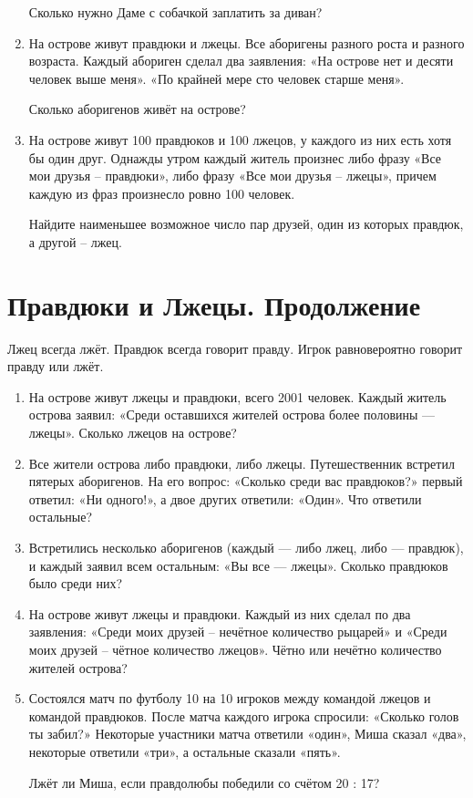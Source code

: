 \documentclass[12pt]{article}
\theoremstyle{definition}
\begin{document}
\begin{enumerate}
  Сколько нужно Даме с собачкой заплатить за диван?

  \item На острове живут правдюки и лжецы. Все аборигены разного роста и разного возраста. Каждый абориген сделал два заявления:
  «На острове нет и десяти человек выше меня». «По крайней мере сто человек старше меня».

  Сколько аборигенов живёт на острове?


  \item На острове живут 100 правдюков и 100 лжецов, у каждого из них есть хотя бы один друг. 
  Однажды утром каждый житель произнес либо фразу «Все мои друзья – правдюки», либо фразу «Все мои друзья – лжецы», 
  причем каждую из фраз произнесло ровно 100 человек. 
  
  Найдите наименьшее возможное число пар друзей, один из которых правдюк, а другой – лжец. 



\end{enumerate}


\setcounter{section}{1}
\section{Правдюки и Лжецы. Продолжение}

Лжец всегда лжёт. Правдюк всегда говорит правду. Игрок равновероятно говорит правду или лжёт. 

\begin{enumerate}
  \item На острове живут лжецы и правдюки, всего 2001 человек. 
  Каждый житель острова заявил: «Среди оставшихся жителей острова более половины — лжецы». 
  Сколько лжецов на острове? 

  \item Все жители острова либо правдюки, либо лжецы. Путешественник встретил пятерых аборигенов. 
  На его вопрос: «Сколько среди вас правдюков?» первый ответил: «Ни одного!», а двое других ответили: «Один». 
  Что ответили остальные?

  \item Встретились несколько аборигенов (каждый — либо лжец, либо — правдюк), и каждый заявил всем остальным: «Вы все — лжецы». 
  Сколько правдюков было среди них?

  \item На острове живут лжецы и правдюки. 
  Каждый из них сделал по два заявления: «Среди моих друзей – нечётное количество рыцарей» и «Среди моих друзей – чётное количество лжецов». 
  Чётно или нечётно количество жителей острова? 

  \item Состоялся матч по футболу 10 на 10 игроков между командой лжецов и командой правдюков. 
  После матча каждого игрока спросили: «Сколько голов ты забил?» 
  Некоторые участники матча ответили «один», Миша сказал «два», некоторые ответили «три», а остальные сказали «пять». 
  
  Лжёт ли Миша, если правдолюбы победили со счётом  20 : 17? 
\end{enumerate}
\end{document}

